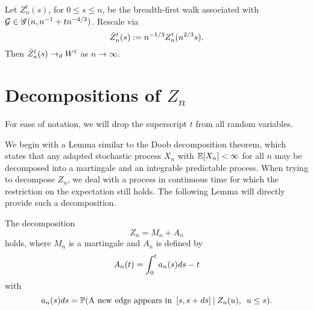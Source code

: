 \begin{theorem} \label{T: Z -> W}
	Let $Z_n^t(s)$, for $0 \leq s \leq n$, 
	be the breadth-first walk associated with $\mathcal{G} \in \mathscr{G}(n, n^{-1} + tn^{-4/3})$.
	Rescale via
	\begin{equation*}
	\bar{Z}^t_n(s) := n^{-1 / 3} Z_n^t(n^{2 / 3}s).
	\end{equation*}
	Then $\bar{Z}^t_n(s) \rightarrow_d W^t$ as $n \rightarrow \infty$.
\end{theorem}



\section{Decompositions of $Z_n$}

For ease of notation, we will drop the superscript $t$ from all random variables.



We begin with a Lemma similar to the Doob decomposition theorem,
which states that any adapted stochastic process $X_n$ with $\mathbb{E}[X_n] < \infty$ for all $n$
may be decomposed into a martingale and an integrable predictable process.
When trying to decompose $Z_n$, we deal with a process in continuous time for which the restriction on the expectation still holds.
The following Lemma will directly provide such a decomposition.

\begin{lemma} \label{L: decomp Zn}
	The decomposition 
	\begin{equation} \label{E: decomp Zn}
	Z_n = M_n + A_n
	\end{equation}
	holds, where $M_n$ is a martingale and $A_n$ is defined by
	\begin{equation} \label{D: An}
	A_n(t) = \int_{0}^{t} a_n(s)ds - t
	\end{equation}
	with
	\begin{equation} \label{D: an}
	a_n(s)ds = \mathbb{P}(\text{A new edge appears in} \enspace [s, s+ds] \: | \: Z_n(u), \enspace u \leq s).
	\end{equation}
\end{lemma}

